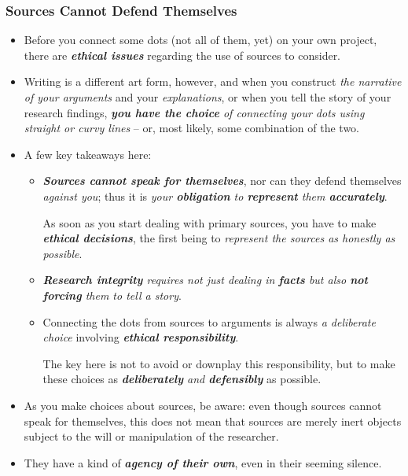 \documentclass[11pt]{article}
\begin{document}
\subsubsection{Sources Cannot Defend Themselves}
\begin{itemize}
\item Before you connect some dots (not all of them, yet) on your own project, there are \emph{\textbf{ethical issues}} regarding the use of sources to consider.

\item Writing is a different art form, however, and when you construct \emph{the narrative of your arguments} and your \emph{explanations}, or when you tell the story of your research findings, \emph{\textbf{you have the choice} of connecting your dots using straight or curvy lines} -- or, most likely, some combination of the two.

\item A few key takeaways here:
\begin{itemize}
\item \emph{\textbf{Sources cannot speak for themselves}}, nor can they defend themselves \emph{against you}; thus it is \emph{your \textbf{obligation} to \textbf{represent} them \textbf{accurately}}.

As soon as you start dealing with primary sources, you have to make \emph{\textbf{ethical decisions}}, the first being to \emph{represent the sources as honestly as possible}.

\item \emph{\textbf{Research integrity} requires not just dealing in \textbf{facts} but also \textbf{not forcing} them to tell a story}. 

\item Connecting the dots from sources to arguments is always \emph{a deliberate choice} involving \emph{\textbf{ethical responsibility}}. 

The key here is not to avoid or downplay this responsibility, but to make these choices as \emph{\textbf{deliberately} and \textbf{defensibly}} as possible.
\end{itemize}

\item As you make choices about sources, be aware: even though sources cannot speak for themselves, this does not mean that sources are merely inert objects subject to the will or manipulation of the researcher. 

\item  They have a kind of \emph{\textbf{agency of their own}}, even in their seeming silence. 


\end{itemize}
\end{document}
